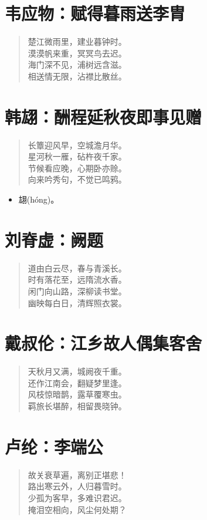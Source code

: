 \documentclass[12pt,oneside]{book}
\newenvironment{shici}{
\begin{verse}
\centering\large\hspace{12pt}}
{\end{verse}}
\begin{document}
\chapter{韦应物：赋得暮雨送李胄}
\begin{shici}
楚江微雨里，建业暮钟时。\\
漠漠帆来重，冥冥鸟去迟。\\
海门深不见，浦树远含滋。\\
相送情无限，沾襟比散丝。
\end{shici}

\chapter{韩翃：酬程延秋夜即事见赠}
\begin{shici}
长簟迎风早，空城澹月华。\\
星河秋一雁，砧杵夜千家。\\
节候看应晚，心期卧亦赊。\\
向来吟秀句，不觉已鸣鸦。
\end{shici}

\begin{itemize}
\item 翃(hóng)。
\end{itemize}

\chapter{刘脊虚：阙题}
\begin{shici}
道由白云尽，春与青溪长。\\
时有落花至，远隋流水香。\\
闲门向山路，深柳读书堂。\\
幽映每白日，清辉照衣裳。
\end{shici}

\chapter{戴叔伦：江乡故人偶集客舍}
\begin{shici}
天秋月又满，城阙夜千重。\\
还作江南会，翻疑梦里逢。\\
风枝惊暗鹊，露草覆寒虫。\\
羁旅长堪醉，相留畏晓钟。
\end{shici}

\chapter{卢纶：李端公}
\begin{shici}
故关衰草遍，离别正堪悲！\\
路出寒云外，人归暮雪时。\\
少孤为客早，多难识君迟。\\
掩泪空相向，风尘何处期？
\end{shici}
\end{document}
